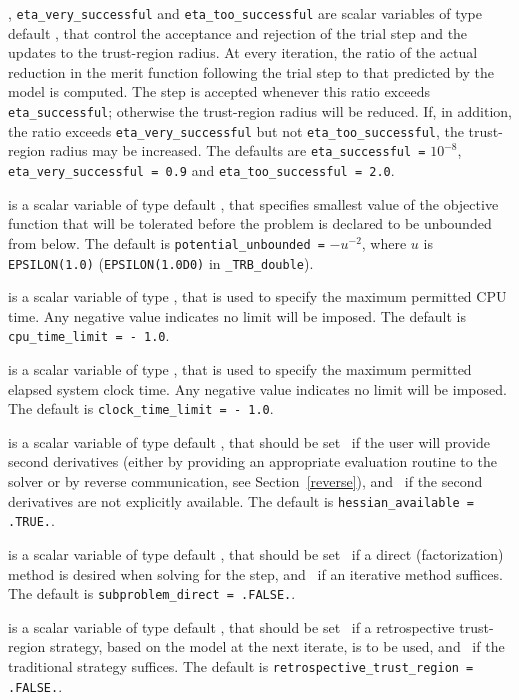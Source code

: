 \documentclass{galahad}
\newcommand{\packagename}{TRB}
\newcommand{\fullpackagename}{\libraryname\_\packagename}
\begin{document}
\begin{description}
, {\tt eta\_very\_successful}
and {\tt eta\_too\_successful}
are scalar variables of type default
\realdp, that control the acceptance and rejection of the trial step
and the updates to the trust-region radius.
At every iteration, the ratio of the actual reduction in the merit function
following the trial step to that predicted by the model is computed.
The step is accepted whenever this ratio exceeds {\tt eta\_successful};
otherwise the trust-region radius will be reduced.
If, in addition, the ratio exceeds {\tt eta\_very\_successful} but not
{\tt eta\_too\_successful}, the trust-region radius may be increased.
The defaults are
{\tt eta\_successful =} $10^{-8}$,
{\tt eta\_very\_successful = 0.9} and
{\tt eta\_too\_successful = 2.0}.

  is a scalar variable of type default
\realdp, that specifies smallest
value of the objective function that will be tolerated before the problem
is declared to be unbounded from below.
The default is {\tt potential\_u\-nbounded =} $-u^{-2}$,
where $u$ is {\tt EPSILON(1.0)} ({\tt EPSILON(1.0D0)} in
{\tt \fullpackagename\_double}).

 is a scalar variable of type \realdp,
that is used to specify the maximum permitted CPU time. Any negative
value indicates no limit will be imposed. The default is
{\tt cpu\_time\_limit = - 1.0}.

 is a scalar variable of type \realdp,
that is used to specify the maximum permitted elapsed system clock time.
Any negative value indicates no limit will be imposed. The default is
{\tt clock\_time\_limit = - 1.0}.

is a scalar variable of type default \logical,
that should be set \true\ if the user will provide second derivatives
(either by providing an appropriate evaluation routine to the solver
or by reverse communication, see Section~\ref{reverse}), and
\false\ if the second derivatives are not explicitly available.
The default is {\tt hessian\_available = .TRUE.}.

is a scalar variable of type default \logical,
that should be set \true\ if a direct (factorization) method is
desired when solving for the step, and \false\ if an iterative
method suffices.
The default is {\tt subproblem\_direct = .FALSE.}.

is a scalar variable of type default \logical,
that should be set \true\ if a retrospective trust-region
strategy, based on the model at the next iterate, is to be used,
and \false\ if the traditional strategy suffices.
The default is {\tt  retrospective\_trust\_region = .FALSE.}.


\end{description}
\end{document}
